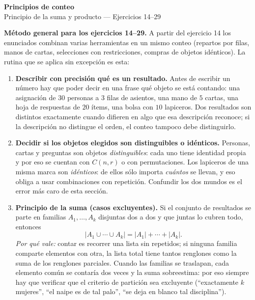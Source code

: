 \documentclass[11pt]{article}
\begin{document}
\begin{center}{\LARGE\bfseries Principios de conteo}\\[2pt]{\large Principio de la suma y producto --- Ejercicios 14--29}\end{center}

\begin{teo}
\textbf{Método general para los ejercicios 14--29.} A partir del ejercicio 14 los enunciados combinan varias herramientas en un mismo conteo (repartos por filas, manos de cartas, selecciones con restricciones, compras de objetos idénticos). La rutina que se aplica sin excepción es esta:

\begin{enumerate}[leftmargin=*]
  \item \textbf{Describir con precisión qué es un resultado.} Antes de escribir un número hay que poder decir en una frase qué objeto se está contando: una asignación de $30$ personas a $3$ filas de asientos, una mano de $5$ cartas, una hoja de respuestas de $20$ ítems, una bolsa con $10$ lapiceros. Dos resultados son distintos exactamente cuando difieren en algo que esa descripción reconoce; si la descripción no distingue el orden, el conteo tampoco debe distinguirlo.

  \item \textbf{Decidir si los objetos elegidos son distinguibles o idénticos.} Personas, cartas y preguntas son objetos \emph{distinguibles}: cada uno tiene identidad propia y por eso se cuentan con $C(n,r)$ o con permutaciones. Los lapiceros de una misma marca son \emph{idénticos}: de ellos sólo importa \emph{cuántos} se llevan, y eso obliga a usar combinaciones con repetición. Confundir los dos mundos es el error más caro de esta sección.

  \item \textbf{Principio de la suma (casos excluyentes).} Si el conjunto de resultados se parte en familias $A_1,\dots,A_k$ disjuntas dos a dos y que juntas lo cubren todo, entonces
  \[
    |A_1\cup\cdots\cup A_k| = |A_1|+\cdots+|A_k| .
  \]
  \emph{Por qué vale:} contar es recorrer una lista sin repetidos; si ninguna familia comparte elementos con otra, la lista total tiene tantos renglones como la suma de los renglones parciales. Cuando las familias se traslapan, cada elemento común se contaría dos veces y la suma sobreestima: por eso siempre hay que verificar que el criterio de partición sea excluyente (``exactamente $k$ mujeres'', ``el naipe es de tal palo'', ``se deja en blanco tal disciplina'').


\end{enumerate}
\end{teo}
\end{document}
